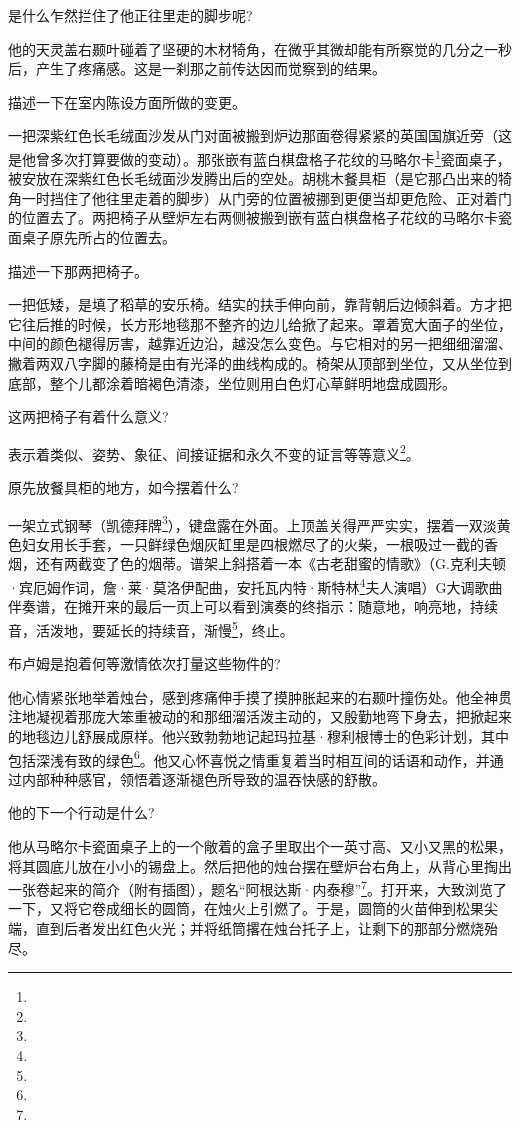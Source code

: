 \par 是什么乍然拦住了他正往里走的脚步呢?
\par 他的天灵盖右颞叶碰着了坚硬的木材犄角，在微乎其微却能有所察觉的几分之一秒后，产生了疼痛感。这是一刹那之前传达因而觉察到的结果。
\par 描述一下在室内陈设方面所做的变更。
\par 一把深紫红色长毛绒面沙发从门对面被搬到炉边那面卷得紧紧的英国国旗近旁（这是他曾多次打算要做的变动）。那张嵌有蓝白棋盘格子花纹的马略尔卡\footnote{}瓷面桌子，被安放在深紫红色长毛绒面沙发腾出后的空处。胡桃木餐具柜（是它那凸出来的犄角一时挡住了他往里走着的脚步）从门旁的位置被挪到更便当却更危险、正对着门的位置去了。两把椅子从壁炉左右两侧被搬到嵌有蓝白棋盘格子花纹的马略尔卡瓷面桌子原先所占的位置去。
\par 描述一下那两把椅子。
\par 一把低矮，是填了稻草的安乐椅。结实的扶手伸向前，靠背朝后边倾斜着。方才把它往后推的时候，长方形地毯那不整齐的边儿给掀了起来。罩着宽大面子的坐位，中间的颜色褪得厉害，越靠近边沿，越没怎么变色。与它相对的另一把细细溜溜、撇着两双八字脚的藤椅是由有光泽的曲线构成的。椅架从顶部到坐位，又从坐位到底部，整个儿都涂着暗褐色清漆，坐位则用白色灯心草鲜明地盘成圆形。
\par 这两把椅子有着什么意义?
\par 表示着类似、姿势、象征、间接证据和永久不变的证言等等意义\footnote{}。
\par 原先放餐具柜的地方，如今摆着什么?
\par 一架立式钢琴（凯德拜牌\footnote{}），键盘露在外面。上顶盖关得严严实实，摆着一双淡黄色妇女用长手套，一只鲜绿色烟灰缸里是四根燃尽了的火柴，一根吸过一截的香烟，还有两截变了色的烟蒂。谱架上斜搭着一本《古老甜蜜的情歌》（G.克利夫顿·宾厄姆作词，詹·莱·莫洛伊配曲，安托瓦内特·斯特林\footnote{}夫人演唱）G大调歌曲伴奏谱，在摊开来的最后一页上可以看到演奏的终指示：随意地，响亮地，持续音，活泼地，要延长的持续音，渐慢\footnote{}，终止。
\par 布卢姆是抱着何等激情依次打量这些物件的?
\par 他心情紧张地举着烛台，感到疼痛伸手摸了摸肿胀起来的右颞叶撞伤处。他全神贯注地凝视着那庞大笨重被动的和那细溜活泼主动的，又殷勤地弯下身去，把掀起来的地毯边儿舒展成原样。他兴致勃勃地记起玛拉基·穆利根博士的色彩计划，其中包括深浅有致的绿色\footnote{}。他又心怀喜悦之情重复着当时相互间的话语和动作，并通过内部种种感官，领悟着逐渐褪色所导致的温吞快感的舒散。
\par 他的下一个行动是什么?
\par 他从马略尔卡瓷面桌子上的一个敞着的盒子里取出个一英寸高、又小又黑的松果，将其圆底儿放在小小的锡盘上。然后把他的烛台摆在壁炉台右角上，从背心里掏出一张卷起来的简介（附有插图），题名“阿根达斯·内泰穆”\footnote{}。打开来，大致浏览了一下，又将它卷成细长的圆筒，在烛火上引燃了。于是，圆筒的火苗伸到松果尖端，直到后者发出红色火光；并将纸筒撂在烛台托子上，让剩下的那部分燃烧殆尽。

